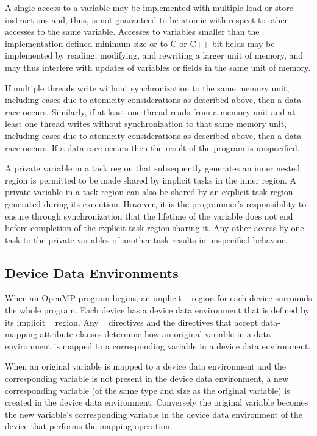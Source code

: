 A single access to a variable may be implemented with multiple load or store
instructions and, thus, is not guaranteed to be atomic with respect to other 
accesses to the same variable. Accesses to variables smaller than the 
implementation defined minimum size or to C or C++ bit-fields may be 
implemented by reading, modifying, and rewriting a larger unit of memory, 
and may thus interfere with updates of variables or fields in the same 
unit of memory.

If multiple threads write without synchronization to the same memory 
unit, including cases due to atomicity considerations as described above, 
then a data race occurs. Similarly, if at least one thread reads from a 
memory unit and at least one thread writes without synchronization to 
that same memory unit, including cases due to atomicity considerations 
as described above, then a data race occurs. If a data race occurs then the
result of the program is unspecified.

A private variable in a task region that subsequently generates an inner 
nested  region is permitted to be made shared by implicit 
tasks in the inner  region. A private variable in a task 
region can also be shared by an explicit task region generated during its 
execution. However, it is the programmer's responsibility to ensure through
synchronization that the lifetime of the variable does not end before 
completion of the explicit task region sharing it. Any other access by 
one task to the private variables of another task results in unspecified 
behavior.



\subsection{Device Data Environments}
\label{subsec:Device Data Environments}
When an OpenMP program begins, an implicit ~ 
region for each device surrounds the whole program. Each device has 
a device data environment that is defined by its implicit 
~ region. Any ~ 
directives and the directives that accept data-mapping attribute 
clauses determine how an original variable in a data environment 
is mapped to a corresponding variable in a device data environment.

When an original variable is mapped to a device data environment 
and the corresponding variable is not present in the device data 
environment, a new corresponding variable (of the same type and 
size as the original variable) is created in the device data 
environment. Conversely the original variable becomes the new 
variable's corresponding variable in the device data environment 
of the device that performs the mapping operation.

